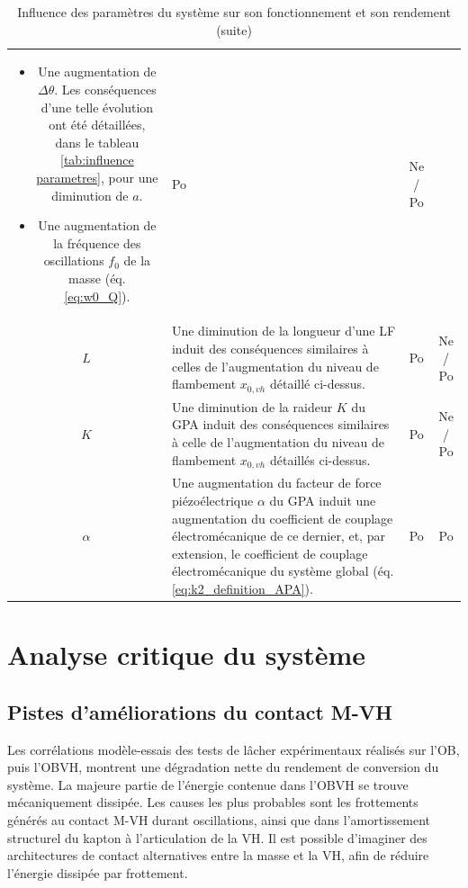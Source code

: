 \begin{landscape}
\begin{table}[!htbp]
\begin{tabular}{ c | m{19cm} | c | c }
\begin{itemize}[label=$\bullet$]
	\item Une augmentation de $\Delta\theta$. Les conséquences d'une telle évolution ont été détaillées, dans le tableau \ref{tab:influence parametres}, pour une diminution de $a$.
	\item Une augmentation de la fréquence des oscillations $f_0$ de la masse (éq. \ref{eq:w0_Q}).
\end{itemize}
& \textcolor{mygreen2}{Po}  	&	\textcolor{Rouge1}{Ne} / \textcolor{mygreen2}{Po}  \\ 
$L$ & Une diminution de la longueur d'une LF induit des conséquences similaires à celles de l'augmentation du niveau de flambement $x_{0,vh}$ détaillé ci-dessus.
& \textcolor{mygreen2}{Po}  	&	\textcolor{Rouge1}{Ne} / \textcolor{mygreen2}{Po}  \\ 
$K$ & Une diminution de la raideur $K$ du GPA induit des conséquences similaires à celle de l'augmentation du niveau de flambement $x_{0,vh}$ détaillés ci-dessus.
& \textcolor{mygreen2}{Po}  	&	\textcolor{Rouge1}{Ne} / \textcolor{mygreen2}{Po}  \\ 
$\alpha$ & Une augmentation du facteur de force piézoélectrique $\alpha$ du GPA induit une augmentation du coefficient de couplage électromécanique de ce dernier, et, par extension, le coefficient de couplage électromécanique du système global (éq. \ref{eq:k2_definition_APA}).
& \textcolor{mygreen2}{Po}  	&	\textcolor{mygreen2}{Po}  \\ 
\bottomrule
	\end{tabular}
	\caption{Influence des paramètres du système sur son fonctionnement et son rendement (suite)}
	\label{tab:influence parametres (suite)}
\end{table}
\end{landscape}
\newpage %
\section{Analyse critique du système}
\label{sec:6.4_Analyse critique du systeme}
	\subsection{Pistes d'améliorations du contact M-VH}
	\label{subsec:6.4.1}
Les corrélations modèle-essais des tests de lâcher expérimentaux réalisés sur l'OB, puis l'OBVH, montrent une dégradation nette du rendement de conversion du système. La majeure partie de l'énergie contenue dans l'OBVH se trouve mécaniquement dissipée. Les causes les plus probables sont les frottements générés au contact M-VH durant oscillations, ainsi que dans l'amortissement structurel du kapton à l'articulation de la VH. Il est possible d'imaginer des architectures de contact alternatives entre la masse et la VH, afin de réduire l'énergie dissipée par frottement.

